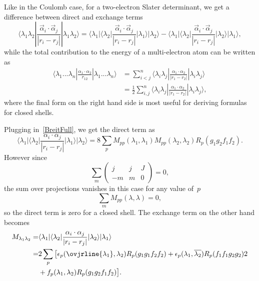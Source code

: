 Like in the Coulomb case, for a two-electron Slater determinant, we get a difference between direct and exchange terms
\begin{equation}
\langle \lambda_1 \lambda_2 | \frac{\vec{\alpha}_i \cdot \vec{\alpha}_j}{|r_i-r_j|} | \lambda_1 \lambda_2 \rangle = \langle \lambda_1 | \langle \lambda_2 | \frac{\vec{\alpha}_i \cdot \vec{\alpha}_j}{|r_i-r_j|} | \lambda_1 \rangle | \lambda_2 \rangle - \langle \lambda_1 | \langle \lambda_2 | \frac{\vec{\alpha}_i \cdot \vec{\alpha}_j}{|r_i-r_j|} | \lambda_2 \rangle | \lambda_1 \rangle,
\end{equation}
while the total contribution to the energy of a multi-electron atom can be written as
\begin{align}
    \langle \lambda_1 ... \lambda_n | \frac{\alpha_1 \cdot \alpha_2}{r_{12}} |\lambda_1 ... \lambda_n \rangle &= \sum_{i < j}^n \langle \lambda_i \lambda_j | \frac{\alpha_1 \cdot \alpha_2}{|r_1-r_2|} |\lambda_i \lambda_j \rangle \nonumber
    \\
    &= \frac{1}{2}\sum_{i,j}^n \langle \lambda_i \lambda_j | \frac{\alpha_1 \cdot \alpha_2}{|r_1-r_2|} |\lambda_i \lambda_j \rangle,
\end{align}
where the final form on the right hand side is most useful for deriving formulas for closed shells. 

Plugging in~\eqref{BreitFull}, we get the direct term as
\begin{equation}
\langle \lambda_1 | \langle \lambda_2 | \frac{\alpha_i \cdot \alpha_j}{|r_i-r_j|} | \lambda_1 \rangle | \lambda_2 \rangle = 8 \sum_p M_{pp}(\lambda_1,\lambda_1)M_{pp}(\lambda_2,\lambda_2)R_p(g_1 g_2 f_1 f_2).
\end{equation}
However since
\begin{equation}
\sum_m \begin{pmatrix} j & j & J\\-m & m & 0 \end{pmatrix} = 0,
\end{equation}
the sum over projections vanishes in this case for any value of~$p$
\begin{equation}
\sum_{m}M_{pp}(\lambda,\lambda)=0,
\end{equation}
so the direct term is zero for a closed shell.
The exchange term on the other hand becomes
\begin{align}
M_{\lambda_1 \lambda_2} = & \langle \lambda_1 | \langle \lambda_2 | \frac{\alpha_i \cdot \alpha_j}{|r_i - r_j|} | \lambda_2 \rangle |\lambda_1 \rangle \nonumber
\\
 = & 2\sum_{p} \big[\epsilon_{p }(\ovjrline{\lambda_1},\lambda_2)R_p(g_1 g_1 f_2 f_2) +\epsilon_{p }(\lambda_1,\overline{\lambda_2})R_p(f_1 f_1 g_2 g_2)2 \nonumber
 \\
 &+ f_{p}(\lambda_1,\lambda_2)R_p(g_1 g_2 f_1 f_2)\big].
\end{align}

